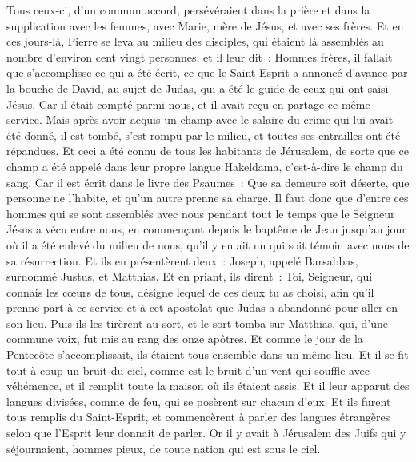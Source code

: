 \begin{multicols}{2}
Tous ceux-ci, d'un commun accord, persévéraient dans la prière et dans la supplication avec les femmes, avec Marie, mère de Jésus, et avec ses frères.
Et en ces jours-là, Pierre se leva au milieu des disciples, qui étaient là assemblés au nombre d'environ cent vingt personnes, et il leur dit~:
Hommes frères, il fallait que s'accomplisse ce qui a été écrit, ce que le Saint-Esprit a annoncé d'avance par la bouche de David, au sujet de Judas, qui a été le guide de ceux qui ont saisi Jésus.
Car il était compté parmi nous, et il avait reçu en partage ce même service.
Mais après avoir acquis un champ avec le salaire du crime qui lui avait été donné, il est tombé, s'est rompu par le milieu, et toutes ses entrailles ont été répandues.
Et ceci a été connu de tous les habitants de Jérusalem, de sorte que ce champ a été appelé dans leur propre langue Hakeldama, c'est-à-dire le champ du sang.
Car il est écrit dans le livre des Psaumes~: Que sa demeure soit déserte, que personne ne l'habite, et qu'un autre prenne sa charge.
Il faut donc que d'entre ces hommes qui se sont assemblés avec nous pendant tout le temps que le Seigneur Jésus a vécu entre nous,
en commençant depuis le baptême de Jean jusqu'au jour où il a été enlevé du milieu de nous, qu'il y en ait un qui soit témoin avec nous de sa résurrection.
Et ils en présentèrent deux~: Joseph, appelé Barsabbas, surnommé Justus, et Matthias.
Et en priant, ils dirent~: Toi, Seigneur, qui connais les cœurs de tous, désigne lequel de ces deux tu as choisi,
afin qu'il prenne part à ce service et à cet apostolat que Judas a abandonné pour aller en son lieu.
Puis ils les tirèrent au sort, et le sort tomba sur Matthias, qui, d'une commune voix, fut mis au rang des onze apôtres.
\VerseOne{}Et comme le jour de la Pentecôte s'accomplissait, ils étaient tous ensemble dans un même lieu.
Et il se fit tout à coup un bruit du ciel, comme est le bruit d'un vent qui souffle avec véhémence, et il remplit toute la maison où ils étaient assis.
Et il leur apparut des langues divisées, comme de feu, qui se posèrent sur chacun d'eux.
Et ils furent tous remplis du Saint-Esprit, et commencèrent à parler des langues étrangères selon que l'Esprit leur donnait de parler.
Or il y avait à Jérusalem des Juifs qui y séjournaient, hommes pieux, de toute nation qui est sous le ciel.

\end{multicols}

